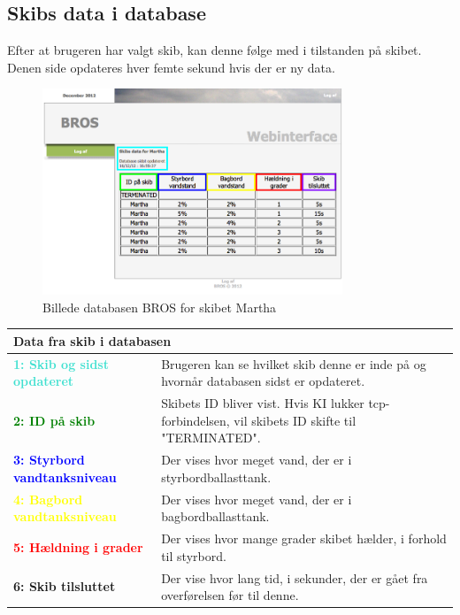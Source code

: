 \subsection*{Skibs data i database}
Efter at brugeren har valgt skib, kan denne følge med i tilstanden på skibet. Denen side opdateres hver femte sekund hvis der er ny data.
\begin{figure}[H]
	\centering
	\includegraphics[width=0.8\textwidth]{billeder/database/web_database}
	\caption{Billede databasen BROS for skibet Martha}
	\label{fig:web_database}
\end{figure}
\begin{table}[H]
\begin{tabular}{l  p{9.3cm}}

\multicolumn{2}{l}{Data fra skib i databasen } \\
\hline
\textcolor{Turquoise}{\textbf{1: Skib og sidst opdateret}}
&Brugeren kan se hvilket skib denne er inde på og hvornår databasen sidst er opdateret.\\
\textcolor{green}{\textbf{2: ID på skib}}
&Skibets ID bliver vist. Hvis KI lukker tcp-forbindelsen, vil skibets ID skifte til "TERMINATED".\\
\textcolor{blue}{\textbf{3: Styrbord vandtanksniveau}}
&Der vises hvor meget vand, der er i styrbordballasttank.\\
\textcolor{yellow}{\textbf{4: Bagbord vandtanksniveau}}
&Der vises hvor meget vand, der er i bagbordballasttank.\\
\textcolor{red}{\textbf{5: Hældning i grader}}
&Der vises hvor mange grader skibet hælder, i forhold til styrbord.\\
\textcolor{RoyalPurple}{\textbf{6: Skib tilsluttet}}
&Der vise hvor lang tid, i sekunder, der er gået fra overførelsen før til denne.\\
\end{tabular}
\end{table}

